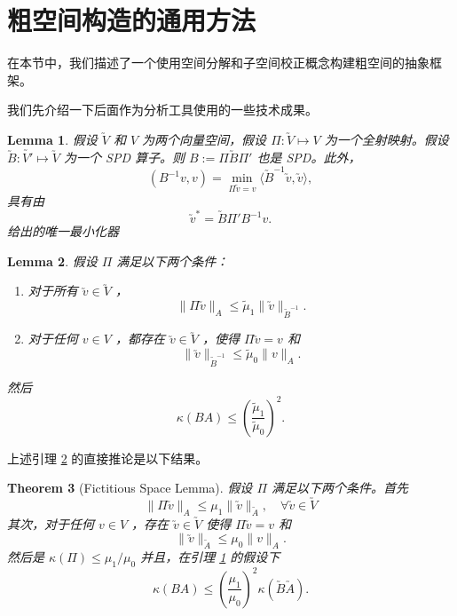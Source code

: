 \documentclass[12pt]{acta_2011xz}
\newtheorem{theorem}{Theorem}[section]
\newtheorem{lemma}[theorem]{Lemma}
\begin{document}
   \section{粗空间构造的通用方法  }       \label{sec:unifiedAMG}    在本节中，我们描述了一个使用空间分解和子空间校正概念构建粗空间的抽象框架。  

我们先介绍一下后面作为分析工具使用的一些技术成果。
   \begin{lemma}   \label{lm:auxiliary}    假设    $\utilde{V}$    和    $V$    为两个向量空间，假设
   $\Pi:\utilde{V}\mapsto V$    为一个全射映射。假设
   $\utilde{B}:\utilde{V'}\mapsto \utilde{V}$    为一个 SPD 算子。则
   $B:=\Pi\utilde{B}\Pi'$    也是 SPD。此外，
   \begin{equation}
  \label{auxi-identity}
    (B^{-1}v,v) =\min_{\Pi\utilde{v}=v}\langle \utilde{B}^{-1}\utilde{v},\utilde{v}\rangle,
\end{equation}    具有由
   \begin{equation}
  \label{minimizer}
  \utilde{v}^*=\utilde{B}\Pi'B^{-1}v.
\end{equation}    给出的唯一最小化器  \end{lemma}   
   \begin{lemma}   \label{l:fictitiousB}    假设    $\Pi$    满足以下两个条件：
   \begin{enumerate}[1.]

    \item   对于所有          $\utilde v\in \utilde V$          ， 
   \begin{equation}
          \label{tBA1}
        \|\Pi \utilde v\|_A\le \tilde\mu_1\|\utilde v\|_{\utilde B^{-1}}.
        \end{equation}      \item   对于任何          $v\in V$          ，都存在          $\utilde v \in\utilde V$          ，使得          $\Pi\utilde v=v$          和 
   \begin{equation}
          \label{tBA0}
        \|\utilde v\|_{\utilde B^{-1}}\le \tilde\mu_0\|v\|_A.   
        \end{equation}     \end{enumerate}    然后
   $$
\kappa (BA)\le \left(\frac{\tilde\mu_1}{\tilde\mu_0}\right)^2.
$$     \end{lemma}     

上述引理    \ref{l:fictitiousB}    的直接推论是以下结果。
   \begin{theorem}[Fictitious Space Lemma]   \label{theorem:fictitiousA}    假设    $\Pi$    满足以下两个条件。首先
   $$
\|\Pi \utilde v\|_A\le \mu_1\|\utilde v\|_{\utilde A}, \quad\forall
\utilde v\in \utilde V
$$    其次，对于任何    $v\in V$    ，存在    $\utilde v \in\utilde V$    使得    $\Pi\utilde v=v$    和 
   $$
\|\utilde v\|_{\utilde A}\le \mu_0\|v\|_A. 
$$    然后是    $\kappa(\Pi)\le \mu_1/\mu_0$    并且，在引理    \ref{lm:auxiliary}    的假设下 
   $$
\kappa (BA)\le \left(\frac{\mu_1}{\mu_0}\right)^2\kappa(\utilde B\utilde A). 
$$     \end{theorem}     
\end{document}
